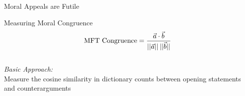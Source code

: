 \documentclass{beamer}
\begin{document}
\begin{frame}{Moral Appeals are Futile}
\begin{figure}
\end{figure}
\end{frame}

\begin{frame}{Measuring Moral Congruence}\centering
\begin{equation*}
\text{MFT Congruence}=\dfrac{\vec{a}\cdot \vec{b}}{||\vec{a}||\hspace{.2em}||\vec{b}||}
\end{equation*}
\vspace{2em}\\
\large{\emph{Basic Approach:}\\Measure the cosine similarity in dictionary counts between opening statements and counterarguments}
\end{frame}
\end{document}
